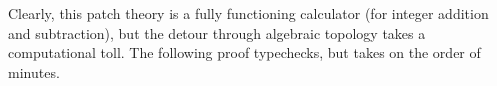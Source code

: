 Clearly, this patch theory is a fully functioning calculator (for integer addition and subtraction),
but the detour through algebraic topology takes a computational toll.
The following proof typechecks, but takes on the order of minutes.
\begin{code}%
%
\>[2]\AgdaFunction{\AgdaUnderscore{}}\AgdaSpace{}%
\AgdaSymbol{:}\AgdaSpace{}%
\AgdaSpace{}%
\AgdaSymbol{(}\AgdaSpace{}%
\AgdaSymbol{)}\AgdaSpace{}%
\AgdaSpace{}%
\AgdaSpace{}%
\<%
\\
%
\>[2]\AgdaSymbol{\AgdaUnderscore{}}\AgdaSpace{}%
\AgdaSymbol{=}\AgdaSpace{}%
\<%
\end{code}


